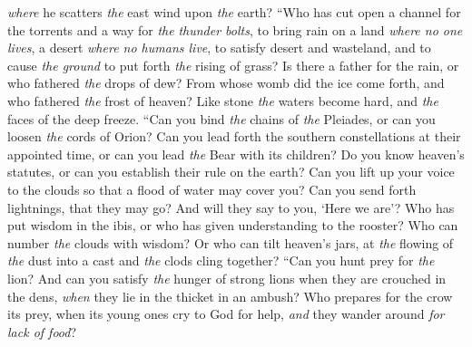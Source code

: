 \begin{biblechapter}
\textit{where} he scatters \textit{the} east wind upon \textit{the} earth?
\verse “Who has cut open a channel for the torrents 
and a way for \textit{the} \textit{thunder bolts},
\verse to bring rain on a land \textit{where no one lives}, 
a desert \textit{where no humans live},
\verse to satisfy desert and wasteland, 
and to cause \textit{the ground} to put forth \textit{the} rising of grass?
\verse Is there a father for the rain, 
or who fathered \textit{the} drops of dew?
\verse From whose womb did the ice come forth, 
and who fathered \textit{the} frost of heaven?
\verse Like stone \textit{the} waters become hard, 
and \textit{the} faces of the deep freeze.
\verse “Can you bind \textit{the} chains of \textit{the} Pleiades, 
or can you loosen \textit{the} cords of Orion?
\verse Can you lead forth the southern constellations at their appointed time, 
or can you lead \textit{the} Bear with its children?
\verse Do you know heaven’s statutes, 
or can you establish their rule on the earth?
\verse Can you lift up your voice to the clouds 
so that a flood of water may cover you?
\verse Can you send forth lightnings, that they may go? 
And will they say to you, ‘Here we are’?
\verse Who has put wisdom in the ibis, 
or who has given understanding to the rooster?
\verse Who can number \textit{the} clouds with wisdom? 
Or who can tilt heaven’s jars,
\verse at \textit{the} flowing of \textit{the} dust into a cast 
and \textit{the} clods cling together?
\verse “Can you hunt prey for \textit{the} lion? 
And can you satisfy \textit{the} hunger of strong lions
\verse when they are crouched in the dens, 
\textit{when} they lie in the thicket in an ambush?
\verse Who prepares for the crow its prey, 
when its young ones cry to God for help, 
\textit{and} they wander around \textit{for lack of food}?
\end{biblechapter}

